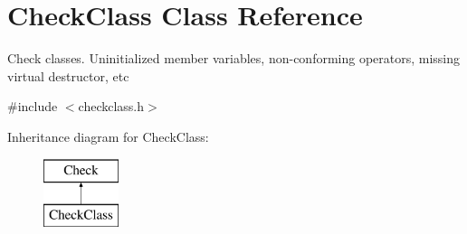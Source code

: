 \hypertarget{class_check_class}{\section{Check\-Class Class Reference}
\label{class_check_class}
}


Check classes. Uninitialized member variables, non-\/conforming operators, missing virtual destructor, etc  




{\ttfamily \#include $<$checkclass.\-h$>$}

Inheritance diagram for Check\-Class\-:\begin{figure}[H]
\begin{center}
\leavevmode
\includegraphics[height=2.000000cm]{class_check_class}
\end{center}
\end{figure}
